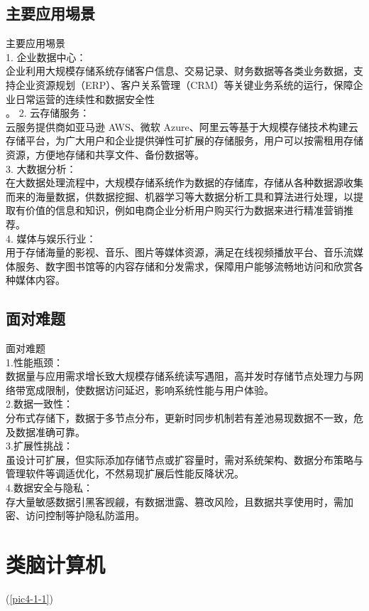 \documentclass[supercite]{Experimental_Report}
\theoremstyle{definition}
\begin{document}
	\subsection{主要应用埸景}
	主要应用埸景\\
	1.	企业数据中心：\\
	企业利用大规模存储系统存储客户信息、交易记录、财务数据等各类业务数据，支持企业资源规划（ERP）、客户关系管理（CRM）等关键业务系统的运行，保障企业日常运营的连续性和数据安全性\\。
	2.	云存储服务：\\
	云服务提供商如亚马逊 AWS、微软 Azure、阿里云等基于大规模存储技术构建云存储平台，为广大用户和企业提供弹性可扩展的存储服务，用户可以按需租用存储资源，方便地存储和共享文件、备份数据等。\\
	3.	大数据分析：\\
	在大数据处理流程中，大规模存储系统作为数据的存储库，存储从各种数据源收集而来的海量数据，供数据挖掘、机器学习等大数据分析工具和算法进行处理，以提取有价值的信息和知识，例如电商企业分析用户购买行为数据来进行精准营销推荐。\\
	4.	媒体与娱乐行业：\\
	用于存储海量的影视、音乐、图片等媒体资源，满足在线视频播放平台、音乐流媒体服务、数字图书馆等的内容存储和分发需求，保障用户能够流畅地访问和欣赏各种媒体内容。\\
	
	
	\subsection{面对难题}
	面对难题\\
	1.性能瓶颈：\\数据量与应用需求增长致大规模存储系统读写遇阻，高并发时存储节点处理力与网络带宽成限制，使数据访问延迟，影响系统性能与用户体验。\\
	2.数据一致性：\\分布式存储下，数据于多节点分布，更新时同步机制若有差池易现数据不一致，危及数据准确可靠。\\
	3.扩展性挑战：\\虽设计可扩展，但实际添加存储节点或扩容量时，需对系统架构、数据分布策略与管理软件等调适优化，不然易现扩展后性能反降状况。\\
	4.数据安全与隐私：\\存大量敏感数据引黑客觊觎，有数据泄露、篡改风险，且数据共享使用时，需加密、访问控制等护隐私防滥用。\\
	

	\section{类脑计算机}
	(\ref{pic4-1-1})
	
\end{document}
